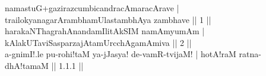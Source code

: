 \documentclass[12pt]{article}
\begin{document}
namastuG+gazirazcumbicandracAmaracArave |\\
trailokyanagarArambhamUlastambhAya zambhave || 1 ||\\
harakaNThagrahAnandamIlitAkSIM namAmyumAm |\\
kAlakUTaviSasparzajAtamUrcchAgamAmiva || 2 ||\\[1ex]

a-gnimI!.le pu-rohi!taM ya-jJasya! de-vamR-tvijaM! |
hotA!raM ratna-dhA!tamaM || 1.1.1 ||
\end{document}
